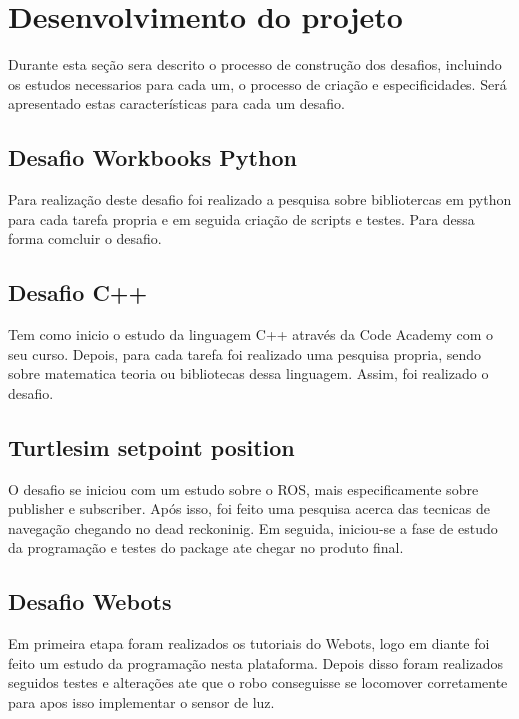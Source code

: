 \chapter{Desenvolvimento do projeto}
\label{chap:metod}

Durante esta seção sera descrito o processo de construção dos desafios, incluindo os estudos necessarios para cada um, o processo de criação e especificidades. Será apresentado estas características para cada um desafio.

\section{Desafio Workbooks Python}

Para realização deste desafio foi realizado a pesquisa sobre bibliotercas em python para cada tarefa propria e em seguida criação de scripts e testes. Para dessa forma comcluir o desafio.

\section{Desafio C++}

Tem como inicio o estudo da linguagem C++ através da Code Academy com o seu curso. Depois, para cada tarefa foi realizado uma pesquisa propria, sendo sobre matematica teoria ou bibliotecas dessa linguagem. Assim, foi realizado o desafio.

\section{Turtlesim setpoint position}

O desafio se iniciou com um estudo sobre o ROS, mais especificamente sobre publisher e subscriber. Após isso, foi feito uma pesquisa acerca das tecnicas de navegação chegando no dead reckoninig. Em seguida, iniciou-se a fase de estudo da programação e testes do package ate chegar no produto final.

\section{Desafio Webots}

Em primeira etapa foram realizados os tutoriais do Webots, logo em diante foi feito um estudo da programação nesta plataforma. Depois disso foram realizados seguidos testes e alterações ate que o robo conseguisse se locomover corretamente para apos isso implementar o sensor de luz.

